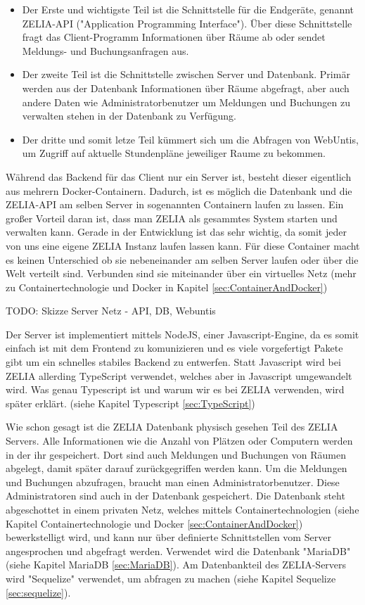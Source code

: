 \begin{itemize}
    \item Der Erste und wichtigste Teil ist die Schnittstelle für die Endgeräte, genannt ZELIA-API ("Application Programming Interface"). Über diese Schnittstelle fragt das Client-Programm Informationen über Räume ab oder sendet Meldungs- und Buchungsanfragen aus.
    \item Der zweite Teil ist die Schnittstelle zwischen Server und Datenbank. Primär werden aus der Datenbank Informationen über Räume abgefragt, aber auch andere Daten wie Administratorbenutzer um Meldungen und Buchungen zu verwalten stehen in der Datenbank zu Verfügung. 
    \item Der dritte und somit letze Teil kümmert sich um die Abfragen von WebUntis, um Zugriff auf aktuelle Stundenpläne jeweiliger Raume zu bekommen.
\end{itemize}

Während das Backend für das Client nur ein Server ist, besteht dieser eigentlich aus mehrern Docker-Containern. Dadurch, ist es möglich die Datenbank und die ZELIA-API am selben Server in sogenannten Containern laufen zu lassen. Ein großer Vorteil daran ist, dass man ZELIA als gesammtes System starten und verwalten kann. Gerade in der Entwicklung ist das sehr wichtig, da somit jeder von uns eine eigene ZELIA Instanz laufen lassen kann. Für diese Container macht es keinen Unterschied ob sie nebeneinander am selben Server laufen oder über die Welt verteilt sind. Verbunden sind sie miteinander über ein virtuelles Netz (mehr zu Containertechnologie und Docker in Kapitel \ref{sec:ContainerAndDocker})

TODO: Skizze Server Netz - API, DB, Webuntis

Der Server ist implementiert mittels NodeJS, einer Javascript-Engine, da es somit einfach ist mit dem Frontend zu komunizieren und es viele vorgefertigt Pakete gibt um ein schnelles stabiles Backend zu entwerfen. Statt Javascript wird bei ZELIA allerding TypeScript verwendet, welches aber in Javascript umgewandelt wird. Was genau Typescript ist und warum wir es bei ZELIA verwenden, wird später erklärt. (siehe Kapitel Typescript \ref{sec:TypeScript})


Wie schon gesagt ist die ZELIA Datenbank physisch gesehen Teil des ZELIA Servers. Alle Informationen wie die Anzahl von Plätzen oder Computern werden in der ihr gespeichert. Dort sind auch Meldungen und Buchungen von Räumen abgelegt, damit später darauf zurückgegriffen werden kann. Um die Meldungen und Buchungen abzufragen, braucht man einen Administratorbenutzer. Diese Administratoren sind auch in der Datenbank gespeichert. Die Datenbank steht abgeschottet in einem privaten Netz, welches mittels Containertechnologien (siehe Kapitel Containertechnologie und Docker \ref{sec:ContainerAndDocker}) bewerkstelligt wird, und kann nur über definierte Schnittstellen vom Server angesprochen und abgefragt werden. Verwendet wird die Datenbank "MariaDB" (siehe Kapitel MariaDB \ref{sec:MariaDB}). Am Datenbankteil des ZELIA-Servers wird "Sequelize" verwendet, um abfragen zu machen (siehe Kapitel Sequelize \ref{sec:sequelize}).


